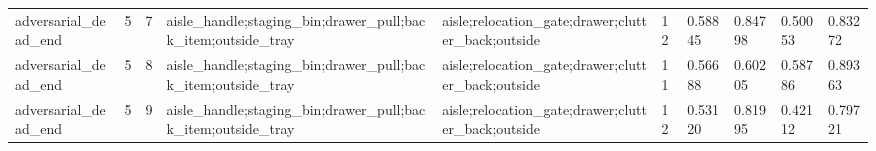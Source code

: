 \documentclass{article}
\begin{document}
\begin{table}[tbp]
{\begin{tabular}{llllllllll}
adversarial\_dead\_end & 5 & 7 & aisle\_handle;staging\_bin;drawer\_pull;back\_item;outside\_tray & aisle;relocation\_gate;drawer;clutter\_back;outside & 12 & 0.58845 & 0.84798 & 0.50053 & 0.83272 \\
adversarial\_dead\_end & 5 & 8 & aisle\_handle;staging\_bin;drawer\_pull;back\_item;outside\_tray & aisle;relocation\_gate;drawer;clutter\_back;outside & 11 & 0.56688 & 0.60205 & 0.58786 & 0.89363 \\
adversarial\_dead\_end & 5 & 9 & aisle\_handle;staging\_bin;drawer\_pull;back\_item;outside\_tray & aisle;relocation\_gate;drawer;clutter\_back;outside & 12 & 0.53120 & 0.81995 & 0.42112 & 0.79721 \\
\bottomrule
\end{tabular}
}
\end{table}

\clearpage
\end{document}
